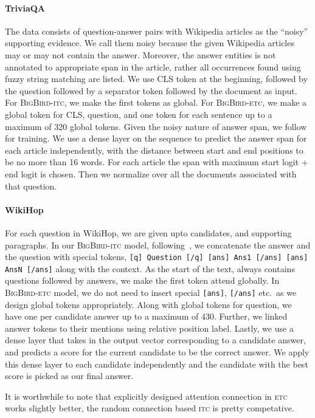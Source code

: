 \documentclass{article}
\newcommand{\bigb}{\textsc{BigBird}\xspace}
\begin{document}
\paragraph{TriviaQA}
The data consists of question-answer pairs with Wikipedia articles as the ``noisy'' supporting evidence.
We call them noisy because the given Wikipedia articles may or may not contain the answer.
Moreover, the answer entities is not annotated to appropriate span in the article, rather all occurrences found using fuzzy string matching are listed.
We use CLS token at the beginning, followed by the question followed by a separator token followed by the document as input.
For \bigb-\textsc{itc}, we make the first  tokens as global. 
For \bigb-\textsc{etc}, we make a global token for CLS, question, and one token for each sentence up to a maximum of 320 global tokens.
Given the noisy nature of answer span, we follow~\citet{clark2017simple} for training.
We use a dense layer on the sequence to predict the answer span for each article independently, with the distance between start and end positions to be no more than 16 words.
For each article the span with maximum start logit + end logit is chosen.
Then we normalize over all the documents associated with that question.


\paragraph{WikiHop}
For each question in WikiHop, we are given upto  candidates, and  supporting paragraphs.
In our \bigb-\textsc{itc} model, following~\citet{beltagy2020longformer}, we concatenate the answer and the question with special tokens, 
\texttt{[q] Question [/q] [ans] Ans1 [/ans]  [ans] AnsN [/ans]} along with the context. 
As the start of the text, always contains questions followed by answers, we make the first  token attend globally. 
In \bigb-\textsc{etc} model, we do not need to insert special \texttt{[ans]}, \texttt{[/ans]} etc.~as we design global tokens appropriately.
Along with global tokens for question, we have one per candidate answer up to a maximum of 430.
Further, we linked answer tokens to their mentions using relative position label. 
Lastly, we use a dense layer that takes in the output vector corresponding to a candidate answer, and predicts a score for the current candidate to be the correct answer.
We apply this dense layer to each candidate independently and 
the candidate with the best score is picked as our final answer.


It is worthwhile to note that explicitly designed attention connection in \textsc{etc} works slightly better, the random connection based \textsc{itc} is pretty competative.
\end{document}
